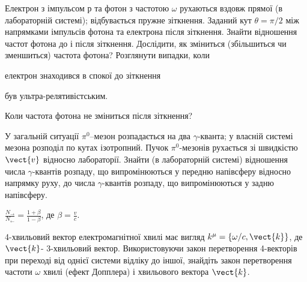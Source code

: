 \begin{problem}
Електрон з імпульсом $р$ та фотон з частотою $\omega$ рухаються вздовж прямої (в лабораторній системі); відбувається пружне зіткнення. Заданий кут $\theta = \pi/2$ між напрямками імпульсів фотона та електрона після зіткнення. Знайти відношення частот фотона до і після зіткнення. Дослідити, як зміниться (збільшиться чи зменшиться) частота фотона? Розглянути випадки, коли
\begin{enumerate*}[label=\alph*)]
	\item електрон знаходився в спокої до зіткнення
	\item був ультра-релятивістським.
\end{enumerate*}
Коли частота фотона не зміниться після зіткнення?
\end{problem}

\begin{problem}
У загальній ситуації $\pi^0$–мезон розпадається на два $\gamma$-кванта; у власній системі мезона розподіл по кутах ізотропний. Пучок $\pi^0$-мезонів рухається зі швидкістю $\vect{v}$ відносно лабораторії. Знайти (в лабораторній системі) відношення числа $\gamma$-квантів розпаду, що випромінюються у передню напівсферу відносно напрямку руху, до числа $\gamma$-квантів розпаду, що випромінюються у задню напівсферу.
\begin{solution}
	$\frac{N_\rightarrow}{N_\leftarrow} = \frac{1+ \beta}{1-\beta}$, де $\beta = \frac{v}{c}$.
\end{solution}
\end{problem}

\begin{problem}
    4-хвильовий вектор електромагнітної хвилі має вигляд $k^{\mu} = \{\omega/c,\vect{k}\}$, де $\vect{k}$- 3-хвильовий вектор. Використовуючи закон перетворення 4-векторів при переході від однієї системи відліку до іншої, знайдіть закон перетворення частоти $\omega$ хвилі (ефект Допплера) і хвильового вектора $\vect{k}$.
\end{problem}



